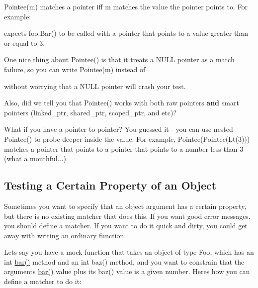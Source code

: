 {\ttfamily Pointee(m)} matches a pointer iff {\ttfamily m} matches the value the pointer points to. For example\+:


\begin{DoxyCode}{0}
\end{DoxyCode}


expects {\ttfamily foo.\+Bar()} to be called with a pointer that points to a value greater than or equal to 3.

One nice thing about {\ttfamily Pointee()} is that it treats a {\ttfamily N\+U\+LL} pointer as a match failure, so you can write {\ttfamily Pointee(m)} instead of


\begin{DoxyCode}{0}
\end{DoxyCode}


without worrying that a {\ttfamily N\+U\+LL} pointer will crash your test.

Also, did we tell you that {\ttfamily Pointee()} works with both raw pointers {\bfseries{and}} smart pointers ({\ttfamily linked\+\_\+ptr}, {\ttfamily shared\+\_\+ptr}, {\ttfamily scoped\+\_\+ptr}, and etc)?

What if you have a pointer to pointer? You guessed it -\/ you can use nested {\ttfamily Pointee()} to probe deeper inside the value. For example, {\ttfamily Pointee(Pointee(\+Lt(3)))} matches a pointer that points to a pointer that points to a number less than 3 (what a mouthful...).

\subsection*{Testing a Certain Property of an Object}

Sometimes you want to specify that an object argument has a certain property, but there is no existing matcher that does this. If you want good error messages, you should define a matcher. If you want to do it quick and dirty, you could get away with writing an ordinary function.

Let\textquotesingle{}s say you have a mock function that takes an object of type {\ttfamily Foo}, which has an {\ttfamily int \mbox{\hyperlink{namespaceokapi_a0b54d28853182078db748ab94cb8cd45}{bar()}}} method and an {\ttfamily int baz()} method, and you want to constrain that the argument\textquotesingle{}s {\ttfamily \mbox{\hyperlink{namespaceokapi_a0b54d28853182078db748ab94cb8cd45}{bar()}}} value plus its {\ttfamily baz()} value is a given number. Here\textquotesingle{}s how you can define a matcher to do it\+:


